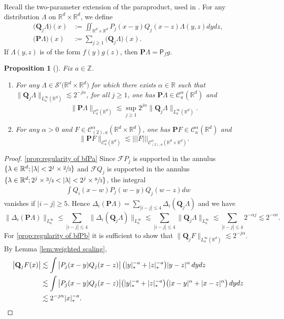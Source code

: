 \documentclass[JEP,XML,SOM,Unicode,published]{cedram}
\newenvironment{enumeratea}
{\bgroup\def\theenumi{\alph{enumi}}\begin{enumerate}}
{\end{enumerate}\egroup}
\theoremstyle{plain}
\newtheorem{prop}[thm]{Proposition}
\theoremstyle{definition}
\newcommand{\trino}[1]{|\!|\!|#1|\!|\!|}
\newcommand{\bfP}{\mathbf{P}}
\newcommand{\bfQ}{\mathbf{Q}}
\newcommand{\sfP}{\mathsf{P}}
\newcommand{\bbR}{\mathbb{R}}
\newcommand{\bbZ}{\mathbb{Z}}
\newcommand{\mcC}{\mathcal{C}}
\newcommand\mcS{\mathcal{S}}
\begin{document}
Recall the two-parameter extension of the paraproduct, used in \cite{BH}. For any distribution $\Lambda$ on $\bbR^d\times \bbR^d$, we define
\begin{align*}
\bigl(\bfQ_j \Lambda\bigr)(x) &:= \iint_{\bbR^d\times\bbR^d} P_j(x-y)Q_j(x-z) \Lambda(y,z)dydz, \\
\bigl(\bfP \Lambda\bigr)(x) &:= \sum_{j\ge1} \bigl(\bfQ_j\Lambda\bigr)(x).
\end{align*}
If $\Lambda(y,z)$ is of the form $f(y)g(z)$, then $\bfP \Lambda=\sfP_fg$.

\begin{prop}[{\cite[Prop.\,8(a)]{BH}}]
\label{prop:regularity of bfP}
Fix $a\in\bbZ$.
\begin{enumeratea}
	\item\label{prop:regularity of bfPa} For any $\Lambda\in\mcS'\bigl(\bbR^d\times\bbR^d\bigr)$ for which there exists $\alpha\in\bbR$ such that $\big\|\bfQ_j\Lambda\big\|_{L_a^\infty(\bbR^d)}\lesssim2^{-j\alpha}$, for all $j\ge1$, one has $\bfP\Lambda\in \mcC_a^\alpha(\bbR^d)$ and
\[
\|\bfP\Lambda\|_{\mcC_a^\alpha(\bbR^d)} \lesssim\sup_{j\ge1}2^{j\alpha} \big\|\bfQ_j\Lambda\big\|_{L_a^\infty(\bbR^d)}.
\]
	\item\label{prop:regularity of bfPb} For any $\alpha>0$ and $F\in\mcC_{(2),a}^\alpha(\bbR^d\times\bbR^d)$, one has $\bfP F\in \mcC_a^\alpha(\bbR^d)$ and
\[
\|\bfP F\|_{\mcC_a^\alpha(\bbR^d)}\lesssim\trino{F}_{\mcC_{(2),a}^\alpha(\bbR^d\times\bbR^d)}.
\]
\end{enumeratea}
\end{prop}

\skpt
\begin{proof}
\eqref{prop:regularity of bfPa} Since $\mathscr{F} P_j$ is supported in the annulus $\{\lambda\in\bbR^d ; |\lambda|<2^j\times\sfrac23\}$ and $\mathscr{F} Q_j$ is supported in the annulus $\{\lambda\in\bbR^d ; 2^j\times\sfrac34 < |\lambda| < 2^j\times\sfrac83\}$, the integral
\begin{align*}
\int Q_i(x-w)P_j(w-y)Q_j(w-z)dw
\end{align*}
vanishes if $|i-j|\ge5$. Hence $\Delta_i({\bfP} \Lambda)=\sum_{|i-j|\le4}\Delta_i(\bfQ_j\Lambda)$ and we have
\[
\|\Delta_i({\bfP} \Lambda)\|_{L^\infty_a}
\le\sum_{|i-j|\le4}\|\Delta_i(\bfQ_j\Lambda)\|_{L^\infty_a}
\lesssim\sum_{|i-j|\le4}\|\bfQ_j\Lambda\|_{L^\infty_a}
\lesssim\sum_{|i-j|\le4}2^{-\alpha j}
\lesssim2^{-\alpha i}.
\]
For \eqref{prop:regularity of bfPb} it is sufficient to show that $\big\|\bfQ_jF\big\|_{L_a^\infty(\bbR^d)}\lesssim2^{-j\alpha}$. By Lemma \ref{lem:weighted scaling},
\begin{align*}
\big|\bfQ_jF(x)\big| &\lesssim \int \big|P_j(x-y)Q_j(x-z)\big| \,\bigl(|y|_*^{-a}+|z|_*^{-a}\bigr) |y-z|^\alpha\, dydz \\
&\lesssim \int \big|P_j(x-y)Q_j(x-z)\big| \bigl(|y|_*^{-a}+|z|_*^{-a}\bigr) \bigl(|x-y|^\alpha+|x-z|^\alpha\bigr) \,dydz \\
&\lesssim2^{-j\alpha}|x|_*^{-a}.\qedhere
\end{align*}
\end{proof}
\end{document}
